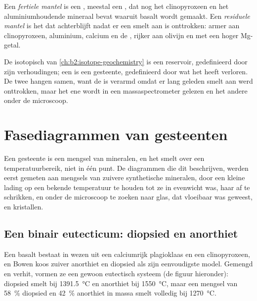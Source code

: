 \begin{definition}\label{def:b2:mantle-melting:fertility}
Een \emph{fertiele mantel} is een , meestal een
, dat nog het clinopyroxeen en het aluminiumhoudende mineraal bevat waaruit
basalt wordt gemaakt. Een \emph{residuele mantel} is het
 dat achterblijft nadat er een smelt aan is onttrokken: armer aan
clinopyroxeen, aluminium, calcium en de , rijker aan
olivijn en met een hoger Mg-getal.
\end{definition}

De isotopisch  van \cref{ch:b2:isotope-geochemistry} is een reservoir,
gedefinieerd door zijn verhoudingen; een  is een gesteente, gedefinieerd door wat het heeft verloren.
De twee hangen samen, want de  is verarmd omdat er lang geleden smelt aan werd
onttrokken, maar het ene wordt in een massaspectrometer gelezen en het andere
onder de microscoop.

\section{Fasediagrammen van gesteenten}\label{sec:b2:mantle-melting:diagrams}

Een gesteente is een mengsel van mineralen, en het smelt over een temperatuurbereik, niet in
één punt. De diagrammen die dit beschrijven, werden eerst gemeten aan mengsels van
zuivere synthetische mineralen, door een kleine lading op een bekende temperatuur te houden tot ze
in evenwicht was, haar af te schrikken, en onder de microscoop te zoeken naar glas,
dat vloeibaar was geweest, en kristallen.

\subsection*{Een binair eutecticum: diopsied en anorthiet}

Een basalt bestaat in wezen uit een calciumrijk plagioklaas en een clinopyroxeen, en
Bowen koos zuiver anorthiet en diopsied als zijn eenvoudigste model. Gemengd en verhit,
vormen ze een gewoon eutectisch
systeem (de figuur hieronder): diopsied smelt bij \qty{1391.5}{\celsius} en anorthiet
bij \qty{1550}{\celsius}, maar een mengsel van \qty{58}{\percent} diopsied en
\qty{42}{\percent} anorthiet in massa smelt volledig bij \qty{1270}{\celsius}.

